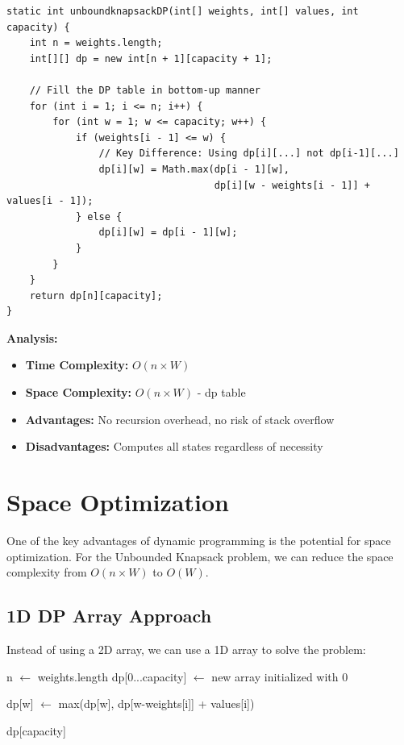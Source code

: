\documentclass{article}
\begin{document}
\begin{lstlisting}[caption=Tabulation Implementation]
static int unboundknapsackDP(int[] weights, int[] values, int capacity) {
    int n = weights.length;
    int[][] dp = new int[n + 1][capacity + 1];
    
    // Fill the DP table in bottom-up manner
    for (int i = 1; i <= n; i++) {
        for (int w = 1; w <= capacity; w++) {
            if (weights[i - 1] <= w) {
                // Key Difference: Using dp[i][...] not dp[i-1][...]
                dp[i][w] = Math.max(dp[i - 1][w], 
                                    dp[i][w - weights[i - 1]] + values[i - 1]);
            } else {
                dp[i][w] = dp[i - 1][w];
            }
        }
    }
    return dp[n][capacity];
}
\end{lstlisting}

\textbf{Analysis:}
\begin{itemize}[leftmargin=*]
    \item \textbf{Time Complexity:} $O(n \times W)$
    \item \textbf{Space Complexity:} $O(n \times W)$ - dp table
    \item \textbf{Advantages:} No recursion overhead, no risk of stack overflow
    \item \textbf{Disadvantages:} Computes all states regardless of necessity
\end{itemize}

\section{Space Optimization}

One of the key advantages of dynamic programming is the potential for space optimization. For the Unbounded Knapsack problem, we can reduce the space complexity from $O(n \times W)$ to $O(W)$.

\subsection{1D DP Array Approach}

Instead of using a 2D array, we can use a 1D array to solve the problem:

\begin{tcolorbox}[title=Algorithm: Space-Optimized Approach]
\begin{algorithm}[H]
\begin{algorithmic}[1]
    \State n $\gets$ weights.length
    \State dp[0...capacity] $\gets$ new array initialized with 0
    
                \State dp[w] $\gets$ max(dp[w], dp[w-weights[i]] + values[i])
            \EndIf
        \EndFor
    \EndFor
    
    \Return dp[capacity]
\EndFunction
\end{algorithmic}
\end{algorithm}
\end{tcolorbox}
\end{document}
